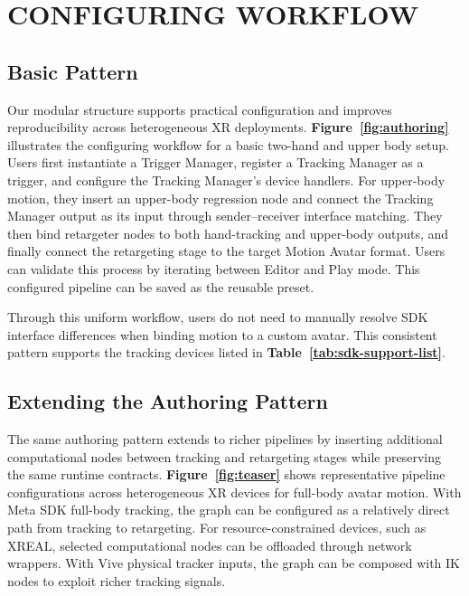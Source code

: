 \section{CONFIGURING WORKFLOW}\label{sec:workflow}

\subsection{Basic Pattern}

Our modular structure supports practical configuration and improves reproducibility across heterogeneous XR deployments.
{\bf Figure~\ref{fig:authoring}} illustrates the configuring workflow for a basic two-hand and upper body setup.
Users first instantiate a Trigger Manager, register a Tracking Manager as a trigger, and configure the Tracking Manager’s device handlers. 
For upper-body motion, they insert an upper-body regression node and connect the Tracking Manager output as its input through sender--receiver interface matching.
They then bind retargeter nodes to both hand-tracking and upper-body outputs, and finally connect the retargeting stage to the target Motion Avatar format.
Users can validate this process by iterating between Editor and Play mode. 
This configured pipeline can be saved as the reusable preset.

Through this uniform workflow, users do not need to manually resolve SDK interface differences when binding motion to a custom avatar. This consistent pattern supports the tracking devices listed in \textbf{Table~\ref{tab:sdk-support-list}}.

\subsection{Extending the Authoring Pattern}
The same authoring pattern extends to richer pipelines by inserting additional computational nodes between tracking and retargeting stages while preserving the same runtime contracts.
{\bf Figure~\ref{fig:teaser}} shows representative pipeline configurations across heterogeneous XR devices for full-body avatar motion.
With Meta SDK full-body tracking, the graph can be configured as a relatively direct path from tracking to retargeting.
For resource-constrained devices, such as XREAL, selected computational nodes can be offloaded through network wrappers.
With Vive physical tracker inputs, the graph can be composed with IK nodes to exploit richer tracking signals.



